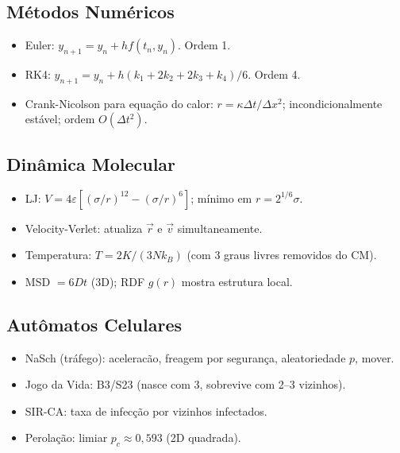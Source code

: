 \documentclass[12pt,a4paper]{article}
\begin{document}
\subsection*{M\'etodos Num\'ericos}
\begin{itemize}
  \item Euler: $y_{n+1} = y_n + hf(t_n,y_n)$. Ordem 1.
  \item RK4: $y_{n+1} = y_n + h(k_1 + 2k_2 + 2k_3 + k_4)/6$. Ordem 4.
  \item Crank-Nicolson para equa\c{c}\~ao do calor: $r = \kappa\Delta t/\Delta x^2$; incondicionalmente est\'avel; ordem $O(\Delta t^2)$.
\end{itemize}

\subsection*{Din\^amica Molecular}
\begin{itemize}
  \item LJ: $V = 4\varepsilon[(\sigma/r)^{12} - (\sigma/r)^6]$; m\'inimo em $r = 2^{1/6}\sigma$.
  \item Velocity-Verlet: atualiza $\vec{r}$ e $\vec{v}$ simultaneamente.
  \item Temperatura: $T = 2K/(3Nk_B)$ (com 3 graus livres removidos do CM).
  \item MSD $= 6Dt$ (3D); RDF $g(r)$ mostra estrutura local.
\end{itemize}

\subsection*{Aut\^omatos Celulares}
\begin{itemize}
  \item NaSch (tr\'afego): acelerac\~ao, freagem por seguran\c{c}a, aleatoriedade $p$, mover.
  \item Jogo da Vida: B3/S23 (nasce com 3, sobrevive com 2--3 vizinhos).
  \item SIR-CA: taxa de infec\c{c}\~ao por vizinhos infectados.
  \item Perola\c{c}\~ao: limiar $p_c \approx 0{,}593$ (2D quadrada).
\end{itemize}
\end{document}
